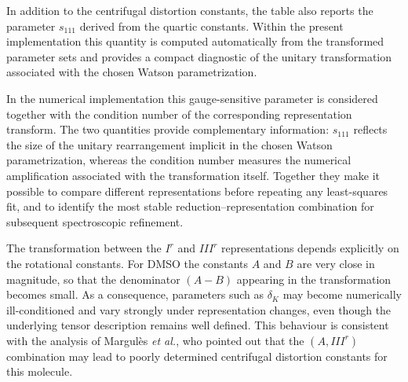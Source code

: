 In addition to the centrifugal distortion constants, the table also
reports the parameter $s_{111}$ derived from the quartic constants.
Within the present implementation this quantity is computed
automatically from the transformed parameter sets and provides a
compact diagnostic of the unitary transformation associated with the
chosen Watson parametrization.

In the numerical implementation this gauge-sensitive parameter is
considered together with the condition number of the corresponding
representation transform.  The two quantities provide complementary
information: $s_{111}$ reflects the size of the unitary rearrangement
implicit in the chosen Watson parametrization, whereas the condition
number measures the numerical amplification associated with the
transformation itself.  Together they make it possible to compare
different representations before repeating any least-squares fit, and
to identify the most stable reduction--representation combination for
subsequent spectroscopic refinement.

The transformation between the $I^r$ and $III^r$ representations
depends explicitly on the rotational constants.  For DMSO the
constants $A$ and $B$ are very close in magnitude, so that the
denominator $(A-B)$ appearing in the transformation becomes small.
As a consequence, parameters such as $\delta_K$ may become
numerically ill-conditioned and vary strongly under representation
changes, even though the underlying tensor description remains well
defined.  This behaviour is consistent with the analysis of
Margul\`es \emph{et al.},\cite{Margules2010} who pointed out that the
$(A,III^r)$ combination may lead to poorly determined centrifugal
distortion constants for this molecule.

